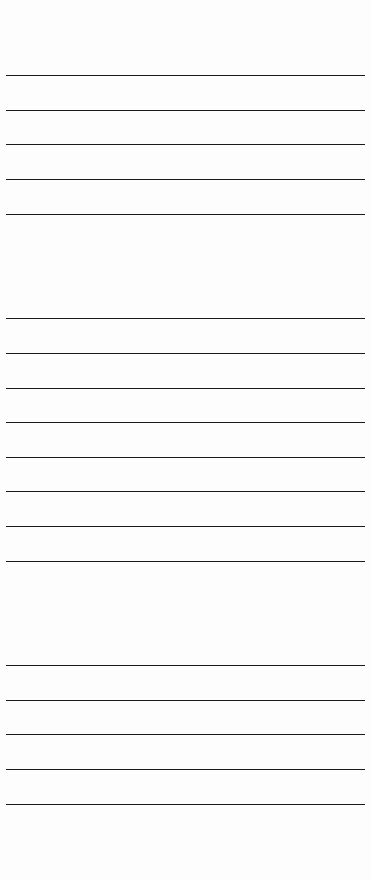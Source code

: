 \documentclass[12pt, fleqn, paper=letter]{scrartcl}
\begin{document}
\vspace{3mm}
\noindent\rule{\columnwidth}{0.4pt}
\\[3mm]\rule{\columnwidth}{0.4pt}
\\[3mm]\rule{\columnwidth}{0.4pt}
\\[3mm]\rule{\columnwidth}{0.4pt}
\\[3mm]\rule{\columnwidth}{0.4pt}
\\[3mm]\rule{\columnwidth}{0.4pt}
\\[3mm]\rule{\columnwidth}{0.4pt}
\\[3mm]\rule{\columnwidth}{0.4pt}
\\[3mm]\rule{\columnwidth}{0.4pt}
\\[3mm]\rule{\columnwidth}{0.4pt}
\\[3mm]\rule{\columnwidth}{0.4pt}
\\[3mm]\rule{\columnwidth}{0.4pt}
\\[3mm]\rule{\columnwidth}{0.4pt}
\\[3mm]\rule{\columnwidth}{0.4pt}
\\[3mm]\rule{\columnwidth}{0.4pt}
\\[3mm]\rule{\columnwidth}{0.4pt}
\\[3mm]\rule{\columnwidth}{0.4pt}
\\[3mm]\rule{\columnwidth}{0.4pt}
\\[3mm]\rule{\columnwidth}{0.4pt}
\\[3mm]\rule{\columnwidth}{0.4pt}
\\[3mm]\rule{\columnwidth}{0.4pt}
\\[3mm]\rule{\columnwidth}{0.4pt}
\\[3mm]\rule{\columnwidth}{0.4pt}
\\[3mm]\rule{\columnwidth}{0.4pt}
\\[3mm]\rule{\columnwidth}{0.4pt}
\\[3mm]\rule{\columnwidth}{0.4pt}
\end{document}
